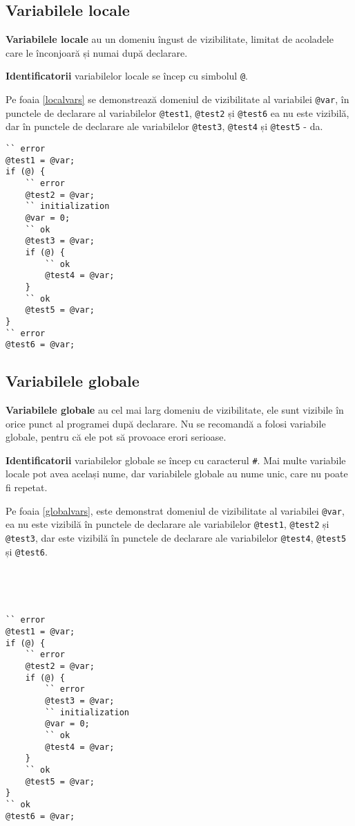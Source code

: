 \subsection{Variabilele locale}

\textbf{Variabilele locale} au un domeniu îngust de vizibilitate, limitat de acoladele care le înconjoară și numai după declarare.

{\bf Identificatorii} variabilelor locale se încep cu simbolul \lstinline|@|.

Pe foaia \ref{localvars} se demonstrează domeniul de vizibilitate al variabilei \lstinline|@var|, în punctele de declarare al variabilelor \lstinline|@test1|, \lstinline|@test2| și \lstinline|@test6| ea nu este vizibilă, dar în punctele de declarare ale variabilelor \lstinline|@test3|, \lstinline|@test4| și \lstinline|@test5| - da.
\begin{lstlisting}[caption=Domeniul de vizibilitate al variabilei locale, label=localvars]
`` error
@test1 = @var;
if (@) {
	`` error
	@test2 = @var;
	`` initialization
	@var = 0;
	`` ok
	@test3 = @var;
	if (@) {
		`` ok
		@test4 = @var;
	}
	`` ok
	@test5 = @var;
}
`` error
@test6 = @var;
\end{lstlisting}

\subsection{Variabilele globale}

\textbf{Variabilele globale} au cel mai larg domeniu de vizibilitate, ele sunt vizibile în orice punct al programei după declarare. Nu se recomandă a folosi variabile globale, pentru că ele pot să provoace erori serioase.

{\bf Identificatorii} variabilelor globale se încep cu caracterul {\color{blue2}\lstinline|#|}. Mai multe variabile locale pot avea același nume, dar variabilele globale au nume unic, care nu poate fi repetat.

Pe foaia \ref{globalvars}, este demonstrat domeniul de vizibilitate al variabilei \lstinline|@var|, ea nu este vizibilă în punctele de declarare ale variabilelor \lstinline|@test1|, \lstinline|@test2| și \lstinline|@test3|, dar este vizibilă în punctele de declarare ale variabilelor \lstinline|@test4|, \lstinline|@test5| și \lstinline|@test6|.

\

\

\begin{lstlisting}[caption=Domeniu de vizibilitate al variabilei globale, label=globalvars]
`` error
@test1 = @var;
if (@) {
	`` error
	@test2 = @var;
	if (@) {
		`` error
		@test3 = @var;
		`` initialization
		@var = 0;
		`` ok
		@test4 = @var;
	}
	`` ok
	@test5 = @var;
}
`` ok
@test6 = @var;
\end{lstlisting}

